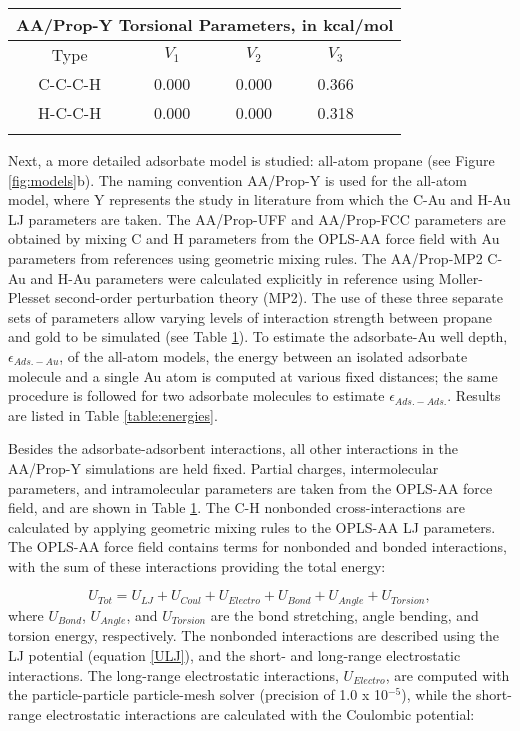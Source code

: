 \documentclass[10pt]{report}  %
\newcommand{\T}{\rule{0pt}{2.6ex}}
\newcommand{\B}{\rule[-1.2ex]{0pt}{0pt}}
\begin{document}
\begin{table} []
\begin{tabular}{ c  c  c  c  c}
\multicolumn{5}{c}{AA/Prop-Y Torsional Parameters, in kcal/mol \cite{Jorgensen:1996}} \\
	\hline
Type \T \B & $V_{1}$ & $V_{2}$ & $V_{3}$ & \\
	\hline
C-C-C-H \T \B & 0.000 & 0.000  & 0.366 & \\
H-C-C-H \T \B & 0.000 & 0.000  & 0.318 & \\
	\hline \\ 

\end{tabular}
\label{table:propane-parameters}
\end{table}

Next, a more detailed adsorbate model is studied: all-atom propane (see Figure \ref{fig:models}b).  The naming convention AA/Prop-Y is used for the all-atom model, where Y represents the study in literature from which the C-Au and H-Au LJ parameters are taken.   The AA/Prop-UFF and AA/Prop-FCC parameters are obtained by mixing C and H parameters from the OPLS-AA force field with Au parameters from references \cite{Rappe:1992,Heinz:2008} using geometric mixing rules.  The AA/Prop-MP2 C-Au and H-Au parameters were calculated explicitly in reference \cite{Piana:2006} using Moller-Plesset second-order perturbation theory (MP2).  The use of these three separate sets of parameters allow varying levels of interaction strength between propane and gold to be simulated (see Table \ref{table:propane-parameters}).  To estimate the adsorbate-Au well depth, $\epsilon_{Ads.-Au}$, of the all-atom models, the energy between an isolated adsorbate molecule and a single Au atom is computed at various fixed distances; the same procedure is followed for two adsorbate molecules to estimate $\epsilon_{Ads.-Ads.}$.  Results are listed in Table \ref{table:energies}. 

Besides the adsorbate-adsorbent interactions, all other interactions in the AA/Prop-Y simulations are held fixed. Partial charges, intermolecular parameters, and intramolecular parameters are taken from the OPLS-AA force field, \cite{Jorgensen:1996} and are shown in Table \ref{table:propane-parameters}. The C-H nonbonded cross-interactions are calculated by applying geometric mixing rules to the OPLS-AA LJ parameters. The OPLS-AA force field contains terms for nonbonded and bonded interactions, with the sum of these interactions providing the total energy:

\begin{equation}U_{Tot} = U_{LJ} + U_{Coul} + U_{Electro} + U_{Bond} + U_{Angle} + U_{Torsion},\label{energy-total}\end{equation} where $U_{Bond}$, $U_{Angle}$, and $U_{Torsion}$ are the bond stretching, angle bending, and torsion energy, respectively. The nonbonded interactions are described using the LJ potential (equation \ref{ULJ}), and the short- and long-range electrostatic interactions. The long-range electrostatic interactions, $U_{Electro}$, are computed with the particle-particle particle-mesh solver (precision of 1.0 x 10$^{-5}$), while the short-range electrostatic interactions are calculated with the Coulombic potential:
\end{document}
